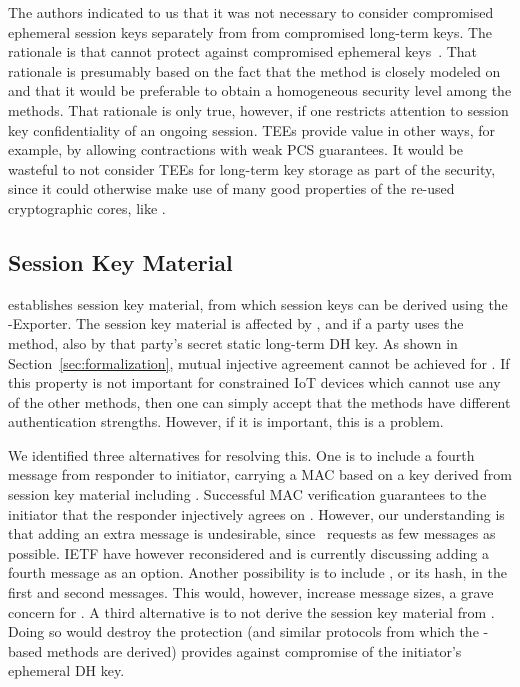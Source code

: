 \documentclass[runningheads, envcountsame, hidelinks, a4paper, draft, x11names]{llncs}
\begin{document}
The \mEdhoc{} authors indicated to us that it was
not necessary to consider compromised ephemeral session keys separately from
from compromised long-term keys.
%
The rationale is that \mSigma{} cannot protect against compromised ephemeral
keys~\cite{personalCommunication}.
%
That rationale is presumably based on the fact that the \mSigSig{} method is
closely modeled on \mSigmaI{} and that it would be preferable to obtain a
homogeneous security level among the \mEdhoc{}
methods.
%
That rationale is only true, however, if one restricts attention to session key
confidentiality of an ongoing session.
%
TEEs provide value in other ways, for example, by allowing contractions with
weak PCS guarantees.
%
It would be wasteful to not consider TEEs for long-term key storage as part of
the security, since it could otherwise make use of many good properties of the
re-used cryptographic cores, like \mOptls.
%
%

\subsection{Session Key Material}
\label{sec:sessionKeyMaterial}
\mEdhoc{} establishes session key material, from which session keys
can be derived using the \mEdhoc{}-Exporter.
%
The session key material is affected by \mGxy{}, and if a party uses the
\mStat{} method, also by that party's secret static long-term DH key.
%
As shown in Section~\ref{sec:formalization}, mutual injective agreement cannot
be achieved for \mGiy{}.
%
If this property is not important for constrained IoT devices which cannot use
any of the other methods, then one can simply accept that the methods have
different authentication strengths.
%
However, if it is important, this is a problem.
%

We identified three alternatives for resolving this.
%
One is to include a fourth message from responder to initiator,
carrying a MAC based on a key derived from session key
material including \mGiy{}.
%
Successful MAC verification guarantees
to the initiator that the responder injectively agrees on \mGiy{}.
%
However, our understanding is that adding an extra message is
undesirable, since~\cite{our-analysis-selander-lake-edhoc-01} requests as few messages as
possible.
%
IETF have however reconsidered and is currently discussing adding a fourth
message as an option.
%
Another possibility is to include \mGi{}, or its hash, in the first and
second messages.
%
This would, however, increase message sizes, a grave concern for \mEdhoc{}.
%
A third alternative is to not derive the session key material from \mGiy{}.
%
Doing so would destroy the protection \mOptls{} (and similar protocols from
which the \mStat{}-based methods are derived) provides against compromise
of the initiator's ephemeral DH key.
%
\end{document}
